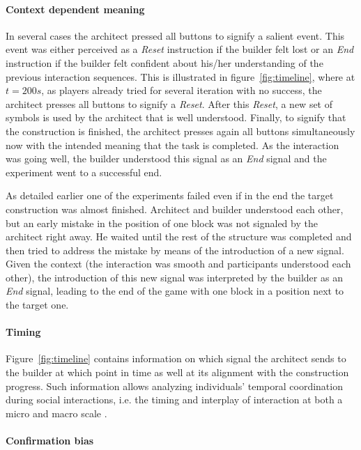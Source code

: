 \paragraph{Context dependent meaning} 

In several cases the architect pressed all buttons to signify a salient event. This event was either perceived as a \emph{Reset} instruction if the builder felt lost or an \emph{End} instruction if the builder felt confident about his/her understanding of the previous interaction sequences. This is illustrated in figure~\ref{fig:timeline}, where at $t=200 s$, as players already tried for several iteration with no success, the architect presses all buttons to signify a \emph{Reset}. After this \emph{Reset}, a new set of symbols is used by the architect that is well understood. Finally, to signify that the construction is finished, the architect presses again all buttons simultaneously now with the intended meaning that the task is completed. As the interaction was going well, the builder understood this signal as an \emph{End} signal and the experiment went to a successful end.

As detailed earlier one of the experiments failed even if in the end the target construction was almost finished. Architect and builder understood each other, but an early mistake in the position of one block was not signaled by the architect right away. He waited until the rest of the structure was completed and then tried to address the mistake by means of the introduction of a new signal. Given the context (the interaction was smooth and participants understood each other), the introduction of this new signal was interpreted by the builder as an \emph{End} signal, leading to the end of the game with one block in a position next to the target one.

\paragraph{Timing} 

Figure~\ref{fig:timeline} contains information on which signal the architect sends to the builder at which point in time as well at its alignment with the construction progress. Such information allows analyzing individuals' temporal coordination during social interactions, i.e. the timing and interplay of interaction at both a micro and macro scale \cite{delaherche2012interpersonal}.

\paragraph{Confirmation bias} 

